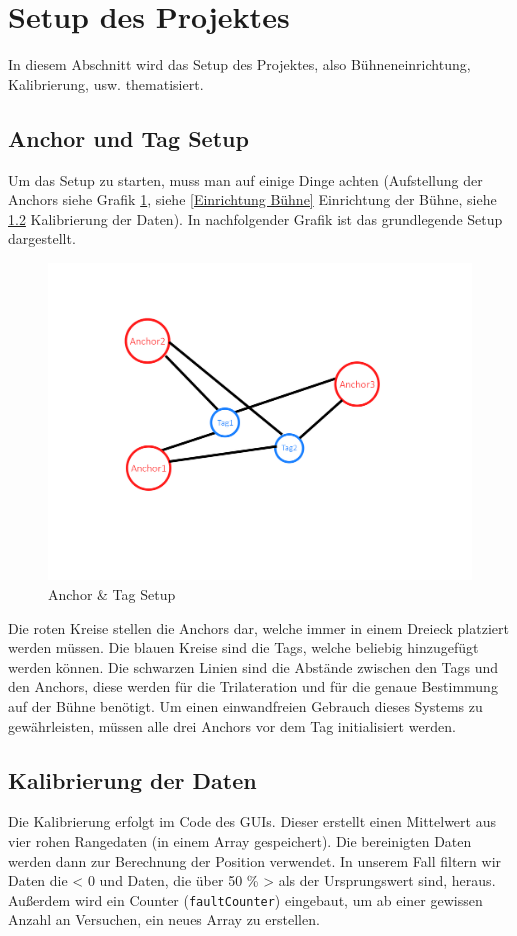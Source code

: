 \newpage
\section{Setup des Projektes}
In diesem Abschnitt wird das Setup des Projektes, also Bühneneinrichtung, Kalibrierung, usw. thematisiert.

\subsection{Anchor und Tag Setup}
Um das Setup zu starten, muss man auf einige Dinge achten (Aufstellung der Anchors siehe Grafik \ref{fig:AnchorTagSetup}, siehe \ref{Einrichtung Bühne} Einrichtung der Bühne, siehe \ref{KalibrierungDerDaten} Kalibrierung der Daten). In nachfolgender Grafik ist das grundlegende Setup dargestellt.

\begin{figure}[H]
	\centering
	\includegraphics[width=0.9\linewidth]{images/AnchorTagSetup.png}
	\caption[AnchorTagSetup]{Anchor \& Tag Setup}
	\label{fig:AnchorTagSetup}
\end{figure}

Die roten Kreise stellen die Anchors dar, welche immer in einem Dreieck platziert werden müssen. Die blauen Kreise sind die Tags, welche beliebig hinzugefügt werden können. Die schwarzen Linien sind die Abstände zwischen den Tags und den Anchors, diese werden für die Trilateration und für die genaue Bestimmung auf der Bühne benötigt. Um einen einwandfreien Gebrauch dieses Systems zu gewährleisten, müssen alle drei Anchors vor dem Tag initialisiert werden. 

\newpage
\subsection{Kalibrierung der Daten}
\label{KalibrierungDerDaten}
Die Kalibrierung erfolgt im Code des GUIs. Dieser erstellt einen Mittelwert aus vier rohen Rangedaten (in einem Array gespeichert). Die bereinigten Daten werden dann zur Berechnung der Position verwendet. In unserem Fall filtern wir Daten die < 0 und Daten, die über 50 \% > als der Ursprungswert sind, heraus. Außerdem wird ein Counter (\texttt{faultCounter}) eingebaut, um ab einer gewissen Anzahl an Versuchen, ein neues Array zu erstellen. 

